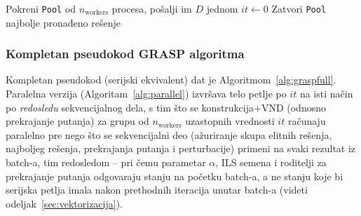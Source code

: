 \documentclass[12pt,a4paper]{article}
\begin{document}
\begin{algorithm}[H]
\caption{GRASP\_Parallel$(D,\, T,\, n_{\text{workers}})$ -- razlika u odnosu na serijsku verziju}
\label{alg:parallel}
\SetAlgoLined
Pokreni \texttt{Pool} od $n_{\text{workers}}$ procesa, pošalji im $D$ jednom\;
$it \leftarrow 0$\;
Zatvori \texttt{Pool}\;
\Return najbolje pronađeno rešenje
\end{algorithm}

\subsubsection{Kompletan pseudokod GRASP algoritma}

Kompletan pseudokod (serijski ekvivalent) dat je
Algoritmom~\ref{alg:graspfull}. Paralelna verzija
(Algoritam~\ref{alg:parallel}) izvršava telo petlje po $it$ na isti način po
\textit{redosledu} sekvencijalnog dela, s tim što se konstrukcija$+$VND
(odnosno prekrajanje putanja) za grupu od $n_{\text{workers}}$ uzastopnih
vrednosti $it$ računaju paralelno pre nego što se sekvencijalni deo (ažuriranje
skupa elitnih rešenja, najboljeg rešenja, prekrajanja putanja i perturbacije)
primeni na svaki rezultat iz batch-a, tim redosledom -- pri čemu parametar
$\alpha$, ILS semena i roditelji za prekrajanje putanja odgovaraju stanju na
početku batch-a, a ne stanju koje bi serijska petlja imala nakon prethodnih
iteracija unutar batch-a (videti odeljak~\ref{sec:vektorizacija}).
\end{document}
